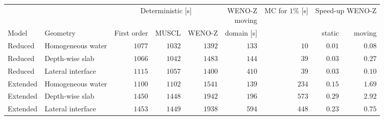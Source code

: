 \begin{tabular}{ll rrr r r rr}
\toprule
 & & \multicolumn{3}{c}{Deterministic [s]} & \shortstack{WENO-Z\\moving} & \shortstack{MC for\\$1\%$ [s]} & \multicolumn{2}{c}{Speed-up WENO-Z} \\
\cmidrule(lr){3-5}\cmidrule(lr){8-9}
Model & Geometry & First order & MUSCL & WENO-Z & domain [s] & & static & moving \\
\midrule
Reduced & Homogeneous water & $1077$ & $1032$ & $1392$ & $133$ & $10$ & $0.01$ & $0.08$ \\
Reduced & Depth-wise slab & $1066$ & $1042$ & $1483$ & $144$ & $39$ & $0.03$ & $0.27$ \\
Reduced & Lateral interface & $1115$ & $1057$ & $1400$ & $410$ & $39$ & $0.03$ & $0.10$ \\
\addlinespace
Extended & Homogeneous water & $1100$ & $1102$ & $1541$ & $139$ & $234$ & $0.15$ & $1.69$ \\
Extended & Depth-wise slab & $1450$ & $1448$ & $1942$ & $196$ & $573$ & $0.29$ & $2.92$ \\
Extended & Lateral interface & $1453$ & $1449$ & $1938$ & $594$ & $448$ & $0.23$ & $0.75$ \\
\bottomrule
\end{tabular}
